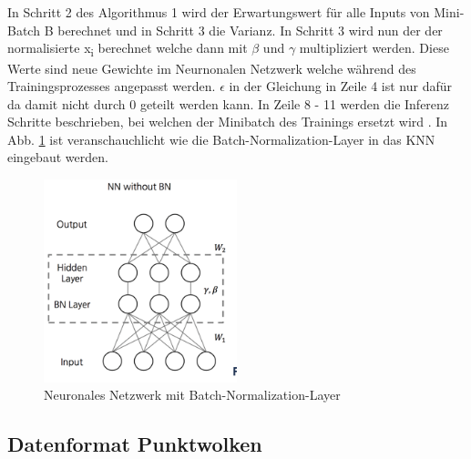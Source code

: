 \documentclass{llncs}
\begin{document}
~\\\\
In Schritt 2 des Algorithmus 1 wird der Erwartungswert für alle Inputs von Mini-Batch B berechnet und in Schritt 3 die Varianz. In Schritt 3 wird nun der der normalisierte x\textsubscript{i} berechnet welche dann mit $\beta$ und $\gamma$ multipliziert werden. Diese Werte sind neue Gewichte im Neurnonalen Netzwerk welche während des Trainingsprozesses angepasst werden. $\epsilon$ in der Gleichung in Zeile 4 ist nur dafür da damit nicht durch 0 geteilt werden kann. In Zeile 8 - 11 werden die Inferenz Schritte beschrieben, bei welchen der Minibatch des Trainings ersetzt wird \cite{batchnorm}. In Abb. \ref{fig:Bild6} ist veranschauchlicht wie die Batch-Normalization-Layer in das KNN eingebaut werden. 

\begin{figure}[htbp] 
	\centering
	\includegraphics[width=0.5\textwidth]{batchnorm.png}
	\caption{Neuronales Netzwerk mit Batch-Normalization-Layer\protect\cite{batchnormweb}}
	\label{fig:Bild6}
\end{figure}

\subsection{Datenformat Punktwolken}\label{sec:punktwolken}
\end{document}
